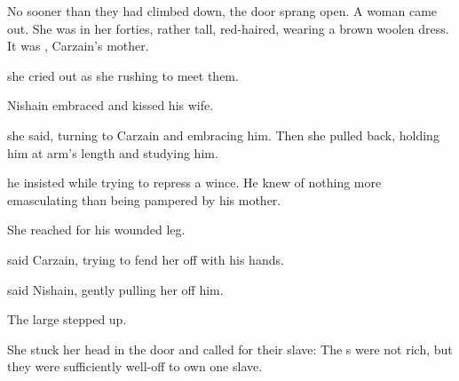 
No sooner than they had climbed down, the door sprang open. 
A woman came out. 
She was in her forties, rather tall, red-haired, wearing a brown woolen dress. 
It was \Roanne{} \Deracille, Carzain's mother. 

 she cried out as she rushing to meet them. 

Nishain embraced and kissed his wife. 

 she said, turning to Carzain and embracing him. 
Then she pulled back, holding him at arm's length and studying him.



 he insisted while trying to repress a wince. 
He knew of nothing more emasculating than being pampered by his mother. 

She reached for his wounded leg. 

said Carzain, trying to fend her off with his hands. 

 said Nishain, gently pulling her off him. 

The large \scatha{} stepped up. 

She stuck her head in the door and called for their slave: 
The \Shireyo s were not rich, but they were sufficiently well-off to own one slave. 

